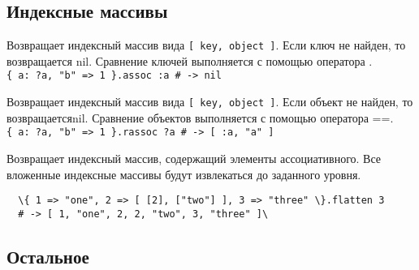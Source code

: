 \subsection*{Индексные массивы}

\begin{methodlist}
  Возвращает индексный массив вида \verb![ key, object ]!. Если ключ не найден, то возвращается nil. Сравнение ключей выполняется с помощью оператора \method{==}. 
  \\\verb!{ a: ?a, "b" => 1 }.assoc :a # -> nil!
 
  Возвращает индексный массив вида \verb![ key, object ]!. Если объект не найден, то возвращаетсяnil. Сравнение объектов выполняется с помощью оператора ==. 
  \\\verb!{ a: ?a, "b" => 1 }.rassoc ?a # -> [ :a, "a" ]!

  Возвращает индексный массив, содержащий элементы ассоциативного. Все вложенные индексные массивы будут извлекаться до заданного уровня.
  \begin{verbatim}
  \{ 1 => "one", 2 => [ [2], ["two"] ], 3 => "three" \}.flatten 3 
  # -> [ 1, "one", 2, 2, "two", 3, "three" ]\
  \end{verbatim}
\end{methodlist}

\subsection*{Остальное}

